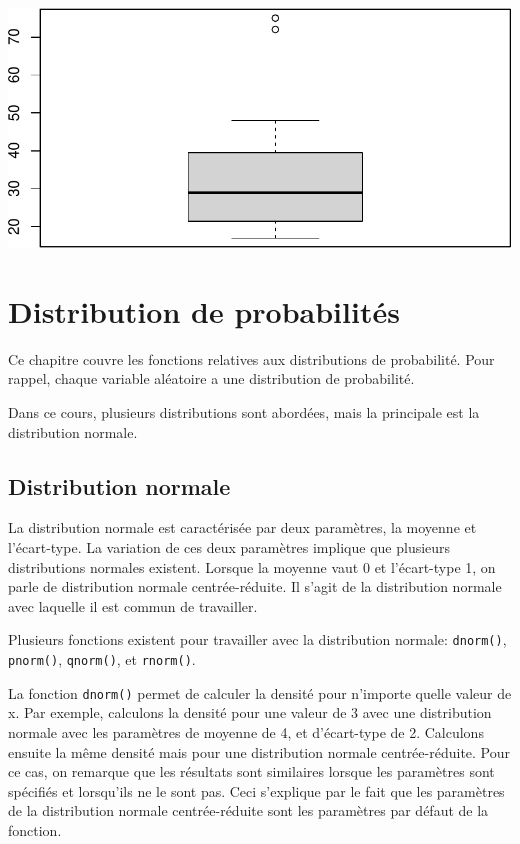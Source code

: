 \documentclass[
]{book}
\newenvironment{Shaded}{\begin{snugshade}}{\end{snugshade}}
\newcommand{\FunctionTok}[1]{\textcolor[rgb]{0.13,0.29,0.53}{\textbf{#1}}}
\newcommand{\NormalTok}[1]{#1}
\newcommand{\SpecialCharTok}[1]{\textcolor[rgb]{0.81,0.36,0.00}{\textbf{#1}}}
\begin{document}
\begin{Shaded}
\end{Shaded}

\includegraphics{_main_files/figure-latex/unnamed-chunk-54-2.pdf}

\chapter{Distribution de probabilités}\label{distribution-de-probabilituxe9s}

Ce chapitre couvre les fonctions relatives aux distributions de probabilité. Pour rappel, chaque variable aléatoire a une distribution de probabilité.

Dans ce cours, plusieurs distributions sont abordées, mais la principale est la distribution normale.

\section{Distribution normale}\label{distribution-normale}

La distribution normale est caractérisée par deux paramètres, la moyenne et l'écart-type. La variation de ces deux paramètres implique que plusieurs distributions normales existent. Lorsque la moyenne vaut 0 et l'écart-type 1, on parle de distribution normale centrée-réduite. Il s'agit de la distribution normale avec laquelle il est commun de travailler.

Plusieurs fonctions existent pour travailler avec la distribution normale: \texttt{dnorm()}, \texttt{pnorm()}, \texttt{qnorm()}, et \texttt{rnorm()}.

La fonction \texttt{dnorm()} permet de calculer la densité pour n'importe quelle valeur de x. Par exemple, calculons la densité pour une valeur de 3 avec une distribution normale avec les paramètres de moyenne de 4, et d'écart-type de 2. Calculons ensuite la même densité mais pour une distribution normale centrée-réduite. Pour ce cas, on remarque que les résultats sont similaires lorsque les paramètres sont spécifiés et lorsqu'ils ne le sont pas. Ceci s'explique par le fait que les paramètres de la distribution normale centrée-réduite sont les paramètres par défaut de la fonction.
\end{document}
